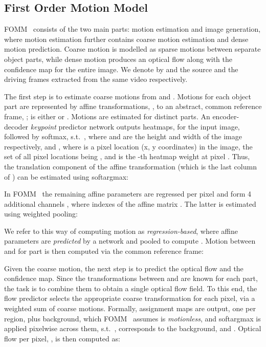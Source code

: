 \documentclass[final]{cvpr}
\begin{document}
\vspace{-0.1cm}
\subsection{First Order Motion Model}
\label{sec:fomm}
\vspace{-0.1cm}
FOMM~\cite{fomm} consists of the two main parts: motion estimation and image generation, where motion estimation further contains coarse motion estimation and dense motion prediction. Coarse motion is modelled as sparse motions between separate object parts, while dense motion produces an optical flow along with the confidence map for the entire image. We denote by  and  the source and the driving frames extracted from the same video respectively.

The first step is to estimate coarse motions from  and . Motions for each object part are represented by affine transformations, , to an abstract, common reference frame, ;  is either  or . Motions are estimated for  distinct parts. An encoder-decoder \emph{keypoint} predictor network outputs  heatmaps,  for the input image, followed by softmax, s.t.~, where  and  are the height and width of the image respectively, and , where  is a pixel location (x, y coordinates) in the image, the set of all pixel locations being , and  is the -th heatmap weight at pixel . Thus, the translation component of the affine transformation (which is the last column of ) can be estimated using softargmax:

In FOMM~\cite{fomm} the remaining affine parameters are regressed per pixel and form 4 additional channels  , where  indexes of the affine matrix . The latter is estimated using weighted pooling:

We refer to this way of computing motion as \emph{regression-based}, where affine parameters are \emph{predicted} by a network and pooled to compute .
Motion between  and  for part  is then computed via the common reference frame:

Given the coarse motion, the next step is to predict the optical flow and the confidence map. 
Since the transformations between  and  are known for each part, the task is to combine them to obtain a single optical flow field. To this end, the flow predictor selects the appropriate coarse transformation for each pixel, via a weighted sum of coarse motions. Formally,  assignment maps are output, one per region, plus background, which FOMM~\cite{fomm} assumes is \emph{motionless}, and softargmax is applied pixelwise across them, s.t.\ ,  corresponds to the background, and . Optical flow per pixel, , is then computed as:
\end{document}

